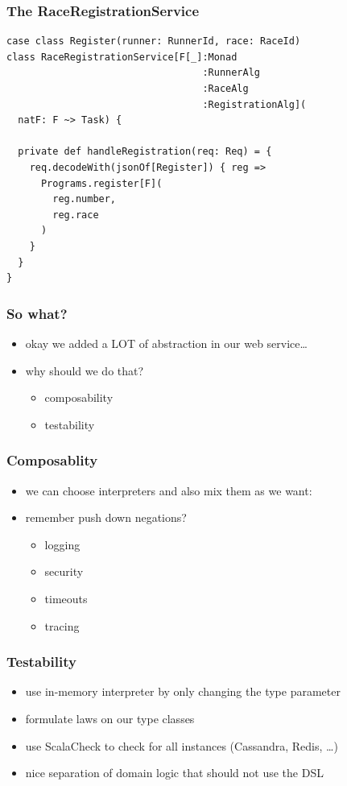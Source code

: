 \documentclass{beamer}
\begin{document}
\begin{frame}[fragile]
  \addtocounter{framenumber}{-1}
  \frametitle{The RaceRegistrationService}
\begin{verbatim}
case class Register(runner: RunnerId, race: RaceId)
class RaceRegistrationService[F[_]:Monad
                                  :RunnerAlg
                                  :RaceAlg
                                  :RegistrationAlg](
  natF: F ~> Task) {

  private def handleRegistration(req: Req) = {
    req.decodeWith(jsonOf[Register]) { reg =>
      Programs.register[F](
        reg.number,
        reg.race
      )
    }
  }
}
\end{verbatim}
\end{frame}

\begin{frame}
  \frametitle{So what?}
  \begin{itemize}
  \item okay we added a LOT of abstraction in our web service\ldots
  \item why should we do that?
    \begin{itemize}
    \item composability
    \item testability
    \end{itemize}
  \end{itemize}
\end{frame}

\begin{frame}
  \frametitle{Composablity}
  \begin{itemize}
  \item we can choose interpreters and also mix them as we want:
  \item remember push down negations?
    \begin{itemize}
    \item logging
    \item security
    \item timeouts
    \item tracing
    \end{itemize}
  \end{itemize}
\end{frame}

\begin{frame}
  \frametitle{Testability}
  \begin{itemize}
  \item use in-memory interpreter by only changing the type parameter
  \item formulate laws on our type classes
  \item use ScalaCheck to check for all instances (Cassandra, Redis,
    \ldots)
  \item nice separation of domain logic that should not use the DSL
  \end{itemize}
\end{frame}
\end{document}
